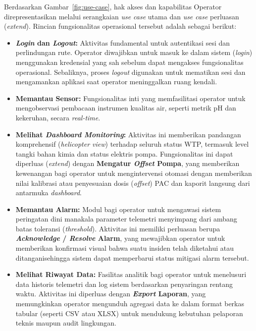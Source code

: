 Berdasarkan Gambar~\ref{fig:use-case}, hak akses dan kapabilitas Operator direpresentasikan melalui serangkaian \textit{use case} utama 
dan \textit{use case} perluasan (\textit{extend}). Rincian fungsionalitas operasional tersebut adalah sebagai berikut:
\begin{itemize}
    \item \textbf{\textit{Login} dan \textit{Logout}:} Aktivitas fundamental untuk autentikasi sesi dan perlindungan rute. 
    Operator diwajibkan untuk masuk ke dalam sistem (\textit{login}) menggunakan kredensial yang sah sebelum dapat mengakses 
    fungsionalitas operasional. Sebaliknya, proses \textit{logout} digunakan untuk mematikan sesi dan mengamankan aplikasi saat 
    operator meninggalkan ruang kendali.
    \item \textbf{Memantau Sensor:} Fungsionalitas inti yang memfasilitasi operator untuk mengobservasi pembacaan instrumen 
    kualitas air, seperti metrik pH dan kekeruhan, secara \textit{real-time}.
    \item \textbf{Melihat \textit{Dashboard Monitoring}:} Aktivitas ini memberikan pandangan komprehensif 
    (\textit{helicopter view}) terhadap seluruh status WTP, termasuk level tangki bahan kimia dan status elektris pompa. 
    Fungsionalitas ini dapat diperluas (\textit{extend}) dengan \textbf{Mengatur \textit{Offset} Pompa}, yang memberikan 
    kewenangan bagi operator untuk mengintervensi otomasi dengan memberikan nilai kalibrasi atau penyesuaian dosis (\textit{offset}) 
    PAC dan kaporit langsung dari antarmuka \textit{dashboard}.
    \item \textbf{Memantau Alarm:} Modul bagi operator untuk mengawasi sistem peringatan dini manakala parameter telemetri menyimpang 
    dari ambang batas toleransi (\textit{threshold}). Aktivitas ini memiliki perluasan berupa 
    \textbf{\textit{Acknowledge} / \textit{Resolve} Alarm}, yang mewajibkan operator untuk memberikan konfirmasi visual bahwa suatu 
    insiden telah diketahui atau ditanganisehingga sistem dapat memperbarui status mitigasi alarm tersebut.
    \item \textbf{Melihat Riwayat Data:} Fasilitas analitik bagi operator untuk menelusuri data historis telemetri dan log sistem 
    berdasarkan penyaringan rentang waktu. Aktivitas ini diperluas dengan \textbf{\textit{Export} Laporan}, yang memungkinkan operator 
    mengunduh agregasi data ke dalam format berkas tabular (seperti CSV atau XLSX) untuk mendukung kebutuhan pelaporan teknis maupun 
    audit lingkungan.
\end{itemize}

